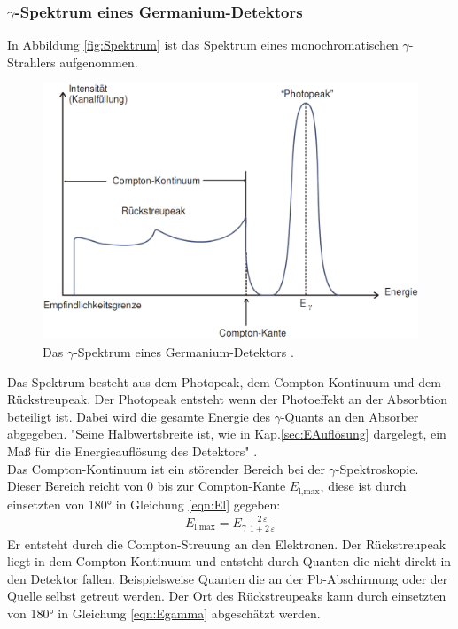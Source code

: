 \subsubsection{\texorpdfstring{$\gamma$}{}-Spektrum eines Germanium-Detektors}
In Abbildung \eqref{fig:Spektrum} ist das Spektrum eines monochromatischen $\gamma$-Strahlers aufgenommen.

\begin{figure} %
	\centering
	\includegraphics[width=0.8\linewidth]{Bilder/Spektrum.png}
	\caption{Das $\gamma$-Spektrum eines Germanium-Detektors \cite{V18}.}
	\label{fig:Spektrum}
\end{figure}

Das Spektrum besteht aus dem Photopeak, dem Compton-Kontinuum und dem Rückstreupeak. Der Photopeak entsteht wenn der Photoeffekt an der Absorbtion beteiligt ist. Dabei wird die gesamte Energie des $\gamma$-Quants an den Absorber abgegeben. "Seine Halbwertsbreite ist, wie in Kap.\ref{sec:EAuflösung} dargelegt, ein Maß für die Energieauflösung des Detektors" \cite[22]{V18}. \\
Das Compton-Kontinuum ist ein störender Bereich bei der $\gamma$-Spektroskopie. Dieser Bereich reicht von 0 bis zur Compton-Kante $E_\text{l,max}$, diese ist durch einsetzten von 180° in Gleichung \eqref{eqn:El} gegeben:
\begin{align}
	E_\text{l,max}= E_\gamma \, \frac{2\,\varepsilon} {1 + 2\,\varepsilon}
\end{align}
Er entsteht durch die Compton-Streuung an den Elektronen. Der Rückstreupeak liegt in dem Compton-Kontinuum und entsteht durch Quanten die nicht direkt in den Detektor fallen. Beispielsweise Quanten die an der Pb-Abschirmung oder der Quelle selbst getreut werden. Der Ort des Rückstreupeaks kann durch einsetzten von 180° in Gleichung \eqref{eqn:Egamma} abgeschätzt werden.



